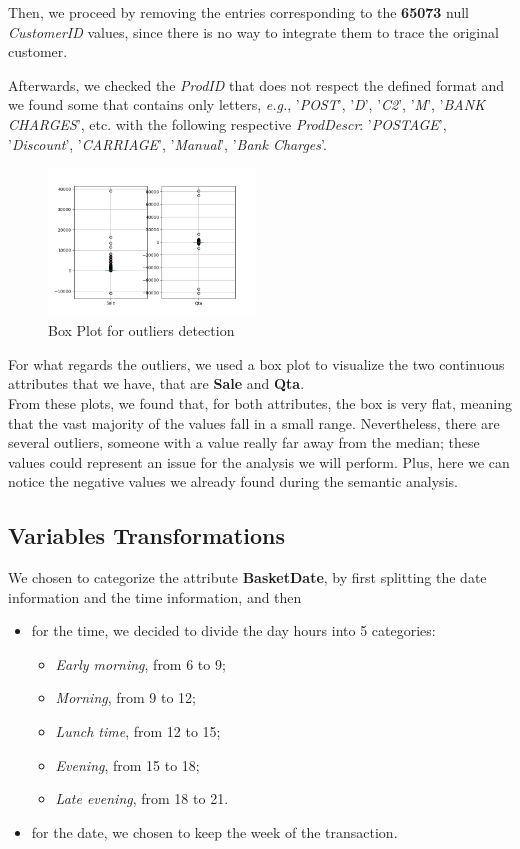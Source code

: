 Then, we proceed by removing the entries corresponding to the \textbf{65073} null \textit{CustomerID} values, since there is no way to integrate them to trace the original customer.

Afterwards, we checked the \textit{ProdID} that does not respect the defined format and we found some that contains only letters, \emph{e.g.}, '\emph{POST}', '\emph{D}', '\emph{C2}', '\emph{M}', '\emph{BANK CHARGES}', etc. with the following respective \textit{ProdDescr}: '\emph{POSTAGE}', '\emph{Discount}', '\emph{CARRIAGE}', '\emph{Manual}', '\emph{Bank Charges}'.

\begin{figure}
\centering
\includegraphics[width=0.49\textwidth]{img/boxplot_before.png}
\caption{Box Plot for outliers detection}
\end{figure}

For what regards the outliers, we used a box plot to visualize the two continuous attributes that we have, that are \textbf{Sale} and \textbf{Qta}.\\
From these plots, we found that, for both attributes, the box is very flat, meaning that the vast majority of the values fall in a small range. Nevertheless, there are several outliers, someone with a value really far away from the median; these values could represent an issue for the analysis we will perform. Plus, here we can notice the negative values we already found during the semantic analysis.

\subsection{Variables Transformations}
We chosen to categorize the attribute \textbf{BasketDate}, by first splitting the date information and the time information, and then

\begin{itemize}
\item for the time, we decided to divide the day hours into 5 categories:
	\begin{itemize}
	\item \emph{Early morning}, from 6 to 9;
	\item \emph{Morning}, from 9 to 12;
	\item \emph{Lunch time}, from 12 to 15;
	\item \emph{Evening}, from 15 to 18;
	\item \emph{Late evening}, from 18 to 21.
	\end{itemize}
\item for the date, we chosen to keep the week of the transaction.
\end{itemize}

